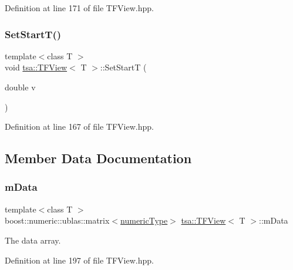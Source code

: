 Definition at line 171 of file T\+F\+View.\+hpp.

\mbox{\label{classtsa_1_1_t_f_view_a19ae1d94585e16c5580d2459a30384a5}} 
\subsubsection{\texorpdfstring{Set\+Start\+T()}{SetStartT()}}
{\footnotesize\ttfamily template$<$class T $>$ \\
void \hyperlink{classtsa_1_1_t_f_view}{tsa\+::\+T\+F\+View}$<$ T $>$\+::Set\+StartT (\begin{DoxyParamCaption}\item[{double}]{v }\end{DoxyParamCaption})\hspace{0.3cm}{\ttfamily [inline]}}



Definition at line 167 of file T\+F\+View.\+hpp.



\subsection{Member Data Documentation}
\mbox{\label{classtsa_1_1_t_f_view_a2681e1d8a18806d0add738068a43bf11}} 
\subsubsection{\texorpdfstring{m\+Data}{mData}}
{\footnotesize\ttfamily template$<$class T $>$ \\
boost\+::numeric\+::ublas\+::matrix$<$\hyperlink{classtsa_1_1_t_f_view_a9dcd740f5d29edefd0a181917a9c700b}{numeric\+Type}$>$ \hyperlink{classtsa_1_1_t_f_view}{tsa\+::\+T\+F\+View}$<$ T $>$\+::m\+Data\hspace{0.3cm}{\ttfamily [protected]}}



The data array. 



Definition at line 197 of file T\+F\+View.\+hpp.

\mbox{\label{classtsa_1_1_t_f_view_a7c966f8d9d2e2f2e4790ed5067f46f40}} 
